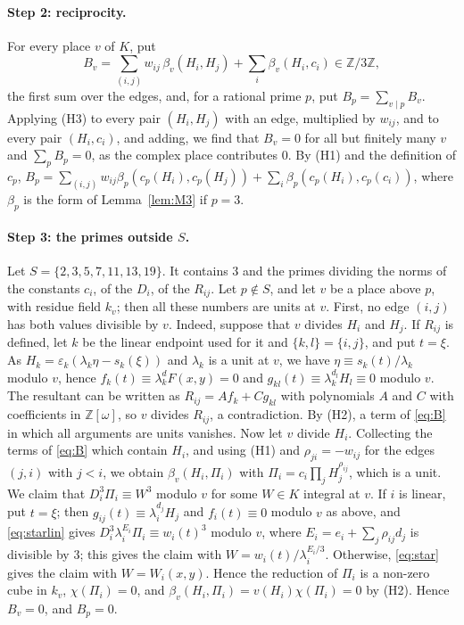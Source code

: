 \documentclass[11pt]{article}
\newcommand{\Z}{\mathbb{Z}}
\begin{document}
\paragraph{Step 2: reciprocity.} For every place $v$ of $K$, put
\begin{equation}\label{eq:B}
B_v=\sum_{(i,j)}w_{ij}\,\beta_v(H_i,H_j)+\sum_i\beta_v(H_i,c_i)\in\Z/3\Z,
\end{equation}
the first sum over the edges, and, for a rational prime $p$, put $B_p=\sum_{v\mid p}B_v$. Applying (H3) to every pair $(H_i,H_j)$ with an edge, multiplied by $w_{ij}$, and to every pair $(H_i,c_i)$, and adding, we find that $B_v=0$ for all but finitely many $v$ and $\sum_pB_p=0$, as the complex place contributes $0$. By (H1) and the definition of $c_p$, $B_p=\sum_{(i,j)}w_{ij}\beta_p(c_p(H_i),c_p(H_j))+\sum_i\beta_p(c_p(H_i),c_p(c_i))$, where $\beta_p$ is the form of Lemma~\ref{lem:M3} if $p=3$.

\paragraph{Step 3: the primes outside $S$.} Let $S=\{2,3,5,7,11,13,19\}$. It contains $3$ and the primes dividing the norms of the constants $c_i$, of the $D_i$, of the $R_{ij}$. Let $p\notin S$, and let $v$ be a place above $p$, with residue field $k_v$; then all these numbers are units at $v$. First, no edge $(i,j)$ has both values divisible by $v$. Indeed, suppose that $v$ divides $H_i$ and $H_j$. If $R_{ij}$ is defined, let $k$ be the linear endpoint used for it and $\{k,l\}=\{i,j\}$, and put $t=\xi$. As $H_k=\varepsilon_k(\lambda_k\eta-s_k(\xi))$ and $\lambda_k$ is a unit at $v$, we have $\eta\equiv s_k(t)/\lambda_k$ modulo $v$, hence $f_k(t)\equiv\lambda_k^dF(x,y)=0$ and $g_{kl}(t)\equiv\lambda_k^{d_l}H_l\equiv0$ modulo $v$. The resultant can be written as $R_{ij}=Af_k+Cg_{kl}$ with polynomials $A$ and $C$ with coefficients in $\Z[\omega]$, so $v$ divides $R_{ij}$, a contradiction. By (H2), a term of \eqref{eq:B} in which all arguments are units vanishes. Now let $v$ divide $H_i$. Collecting the terms of \eqref{eq:B} which contain $H_i$, and using (H1) and $\rho_{ji}=-w_{ij}$ for the edges $(j,i)$ with $j<i$, we obtain $\beta_v(H_i,\Pi_i)$ with $\Pi_i=c_i\prod_jH_j^{\rho_{ij}}$, which is a unit. We claim that $D_i^3\Pi_i\equiv W^3$ modulo $v$ for some $W\in K$ integral at $v$. If $i$ is linear, put $t=\xi$; then $g_{ij}(t)\equiv\lambda_i^{d_j}H_j$ and $f_i(t)\equiv0$ modulo $v$ as above, and \eqref{eq:starlin} gives $D_i^3\lambda_i^{E_i}\Pi_i\equiv w_i(t)^3$ modulo $v$, where $E_i=e_i+\sum_j\rho_{ij}d_j$ is divisible by $3$; this gives the claim with $W=w_i(t)/\lambda_i^{E_i/3}$. Otherwise, \eqref{eq:star} gives the claim with $W=W_i(x,y)$. Hence the reduction of $\Pi_i$ is a non-zero cube in $k_v$, $\chi(\Pi_i)=0$, and $\beta_v(H_i,\Pi_i)=v(H_i)\chi(\Pi_i)=0$ by (H2). Hence $B_v=0$, and $B_p=0$.
\end{document}
